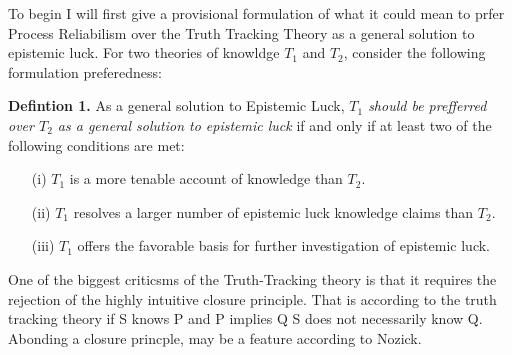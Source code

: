 \documentclass{article}
\begin{document}
To begin I will first give a provisional formulation of what it could mean to
prfer Process Reliabilism over the Truth Tracking Theory as a general solution to epistemic luck.
For two theories of knowldge $T_{1}$ and $T_{2}$, consider the following
formulation preferedness:
\begin{displayquote}
    \textbf{Defintion 1.} As a general solution to Epistemic Luck,
    \textit{$T_{1}$ should be prefferred over $T_{2}$ as a general solution
    to epistemic luck} if and only if at least two of the following conditions are met:
    \begin{enumerate}
        \item[(i)] $T_{1}$ is a more tenable account of knowledge than $T_{2}$.
        \item[(ii)] $T_{1}$ resolves a larger number of epistemic luck knowledge claims than $T_{2}$.
        \item[(iii)] $T_{1}$ offers the favorable basis for further investigation of epistemic luck.
    \end{enumerate}
\end{displayquote}


One of the biggest criticsms of the Truth-Tracking theory is that it requires
the rejection of the highly intuitive closure principle. That is according
to the truth tracking theory if S knows P and P implies Q S does not necessarily know Q.
Abonding a closure princple, may be a feature according to Nozick.



\end{document}

